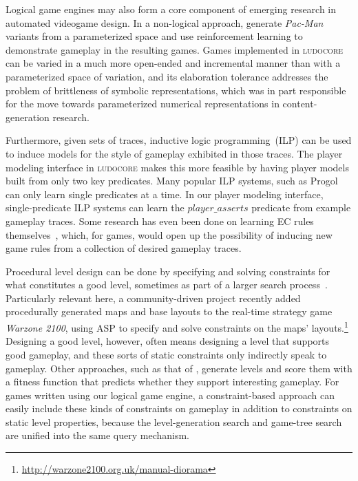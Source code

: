 \documentclass[conference]{IEEEtran}
\newcommand{\ludocore}{\textsc{ludocore}}
\newcommand{\logical}[1]{$#1$}
\begin{document}
Logical game engines may also form a core component of emerging research in
automated videogame design. In a non-logical approach,
\citet{Togelius:Experiment} generate \emph{Pac-Man} variants from a
parameterized space and use reinforcement learning to demonstrate gameplay in
the resulting games. Games implemented in \ludocore{} can be varied in a much
more open-ended and incremental manner than with a parameterized space of
variation, and its elaboration tolerance addresses the problem of brittleness
of symbolic representations, which was in part responsible for the move towards
parameterized numerical representations in content-generation research.

Furthermore, given sets of traces, inductive logic programming~(ILP) can be
used to induce models for the style of gameplay exhibited in those traces. The
player modeling interface in \ludocore{} makes this more feasible by
having player models built from only two key predicates. Many popular ILP
systems, such as Progol~\citep{Progol} can only learn single predicates at a
time. In our player modeling interface, single-predicate ILP systems can learn
the \logical{player\_asserts} predicate from example gameplay traces. Some research has
even been done on learning EC rules themselves~\citep{ECILP}, which, for games,
would open up the possibility of inducing new game rules from a collection of
desired gameplay traces.

Procedural level design can be done by specifying and solving constraints for
what constitutes a good level, sometimes as part of a larger search
process~\cite[e.g.][]{Gillian:FDG09}. Particularly relevant here, a
community-driven project recently added procedurally generated maps and base
layouts to the real-time strategy game \emph{Warzone 2100}, using ASP to specify and
solve constraints on the maps'
layouts.\footnote{\url{http://warzone2100.org.uk/manual-diorama}} Designing a good level,
however, often means designing a level that supports good gameplay, and these
sorts of static constraints only indirectly speak to gameplay. Other
approaches, such as that of \citet{Togelius:levels},
generate levels and score them with a fitness function that predicts whether
they support interesting gameplay. For games written using our logical game
engine, a constraint-based approach can easily include these kinds of
constraints on gameplay in addition to constraints on static level properties,
because the level-generation search and game-tree search are unified into the
same query mechanism. 
\end{document}
